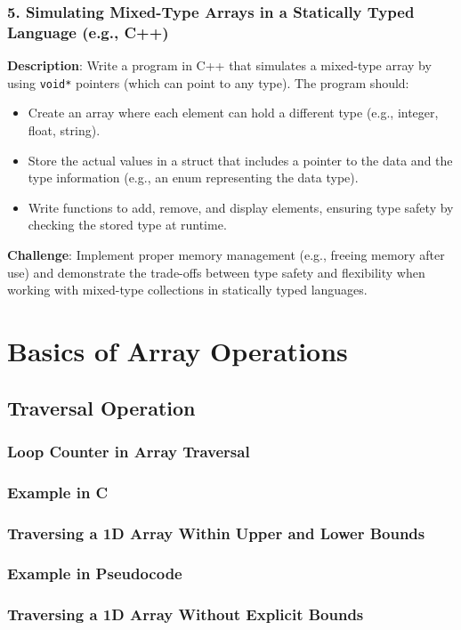 \documentclass[12pt, oneside]{book}
\begin{document}
\subsection*{5. Simulating Mixed-Type Arrays in a Statically Typed Language (e.g., C++)}
\textbf{Description}: Write a program in C++ that simulates a mixed-type array by using \texttt{void*} pointers (which can point to any type). The program should:
\begin{itemize}
	\item Create an array where each element can hold a different type (e.g., integer, float, string).
	\item Store the actual values in a struct that includes a pointer to the data and the type information (e.g., an enum representing the data type).
	\item Write functions to add, remove, and display elements, ensuring type safety by checking the stored type at runtime.
\end{itemize}

\textbf{Challenge}: Implement proper memory management (e.g., freeing memory after use) and demonstrate the trade-offs between type safety and flexibility when working with mixed-type collections in statically typed languages.

\chapter{Basics of Array Operations}
\section{Traversal Operation}
\subsection{Loop Counter in Array Traversal} 
\subsection{Example in C}
\subsection{Traversing a 1D Array Within Upper and Lower Bounds}
\subsection{ Example in Pseudocode}
\subsection{Traversing a 1D Array Without Explicit Bounds}
\end{document}
